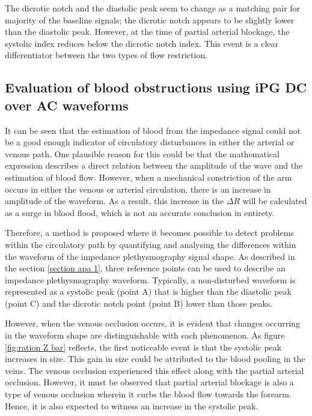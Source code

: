 The dicrotic notch and the diastolic peak seem to change as a matching pair for majority of the baseline signals; the dicrotic notch appears to be slightly lower than the diastolic peak. However, at the time of partial arterial blockage, the systolic index reduces below the dicrotic notch index. This event is a clear differentiator between the two types of flow restriction.

\subsection{Evaluation of blood obstructions using iPG DC over AC waveforms}  %
\label{section discussion 5}
It can be seen that the estimation of blood from the impedance signal could not be a good enough indicator of circulatory disturbances in either the arterial or venous path. One plausible reason for this could be that the mathematical expression describes a direct relation between the amplitude of the wave and the estimation of blood flow. However, when a mechanical constriction of the arm occurs in either the venous or arterial circulation, there is an increase in amplitude of the waveform. As a result, this increase in the $\Delta R$ will be calculated as a surge in blood flood, which is not an accurate conclusion in entirety. 

Therefore, a method is proposed where it becomes possible to detect problems within the circulatory path by quantifying and analysing the differences within the waveform of the impedance plethysmography signal shape. As described in the section \ref{section apa 1}, three reference points can be used to describe an impedance plethysmography waveform. Typically, a non-disturbed waveform is represented as a systolic peak (point A) that is higher than the diastolic peak (point C) and the dicrotic notch point (point B) lower than those peaks. 

However, when the venous occlusion occurs, it is evident that changes occurring in the waveform shape are distinguishable with each phenomenon. As figure \ref{fig:ration Z bar} reflects, the first noticeable event is that the systolic peak increases in size. This gain in size could be attributed to the blood pooling in the veins. The venous occlusion experienced this effect along with the partial arterial occlusion. However, it must be observed that partial arterial blockage is also a type of venous occlusion wherein it curbs the blood flow towards the forearm. Hence, it is also expected to witness an increase in the systolic peak. 

